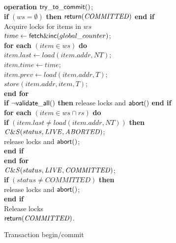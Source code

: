 \documentclass[11pt]{article}
\begin{document}
\begin{figure}[htb]
{{\begin{minipage}[t]{150mm}
\begin{tabbing}
{\bf operation}  ${\sf try\_to\_commit}()$;\\
 \> {\bf if} $(ws = \emptyset)$ {\bf then} ${\sf return}(\mathit{COMMITTED})$ {\bf end if} \\
 \> Acquire locks for items in $ws$ \\
 \> $time \gets {\sf fetch\&inc}(global\_counter)$; \\
 \> {\bf for each} $(item \in ws)$ {\bf do} \\
 \>\> $item.last \gets load(item.addr, NT)$; \\
 \>\> $item.time \gets time$; \\
 \>\> $item.prev \gets load(item.addr, T)$; \\
 \>\> $store(item.addr, item, T)$; \\
 \> {\bf end for} \\
 \> {\bf if} $\neg{\sf validate\_all}()$ {\bf then} release locks and ${\sf abort}()$ {\bf end if} \\
 \> {\bf for each} $(item \in ws \cap rs)$ {\bf do} \\
 \>\> {\bf if} $(item.last \neq load(item.addr, NT))$ {\bf then} \\
 \>\>\> ${\sf \mathit{C\&S}}(status, \mathit{LIVE}, \mathit{ABORTED})$; \\
 \>\>\> release locks and ${\sf abort}()$; \\
 \>\> {\bf end if} \\
 \> {\bf end for} \\
 \> ${\sf \mathit{C\&S}}(status, \mathit{LIVE}, \mathit{COMMITTED})$; \\
 \> {\bf if} $(status \neq \mathit{COMMITTED})$ {\bf then} \\
 \>\> release locks and ${\sf abort}()$; \\
 \> {\bf end if} \\
 \> Release locks \\
 \> ${\sf return}(\mathit{COMMITTED})$. \\


\end{tabbing}
\normalsize
\end{minipage}
}
\caption{Transaction begin/commit}
\label{fig-prevent-looping}
}
\end{figure}



\end{document}
